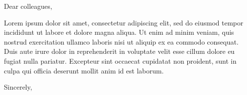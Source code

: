 \documentclass[11pt,a4paper]{letter-umons}
\begin{document}
\renewcommand{\fromname}{Docteur Jacques Legrand}
\signature{Dr. Jacques Legrand}
\date{Mons, le 28 août 2023}


\begin{letter}{}
  \subject{Letter of support} %

  \opening{Dear colleagues,}

  Lorem ipsum dolor sit amet, consectetur adipiscing elit, sed do
  eiusmod tempor incididunt ut labore et dolore magna aliqua. Ut enim
  ad minim veniam, quis nostrud exercitation ullamco laboris nisi ut
  aliquip ex ea commodo consequat. Duis aute irure dolor in
  reprehenderit in voluptate velit esse cillum dolore eu fugiat nulla
  pariatur. Excepteur sint occaecat cupidatat non proident, sunt in
  culpa qui officia deserunt mollit anim id est laborum.

  \closing{Sincerely,}

\end{letter}
\end{document}
